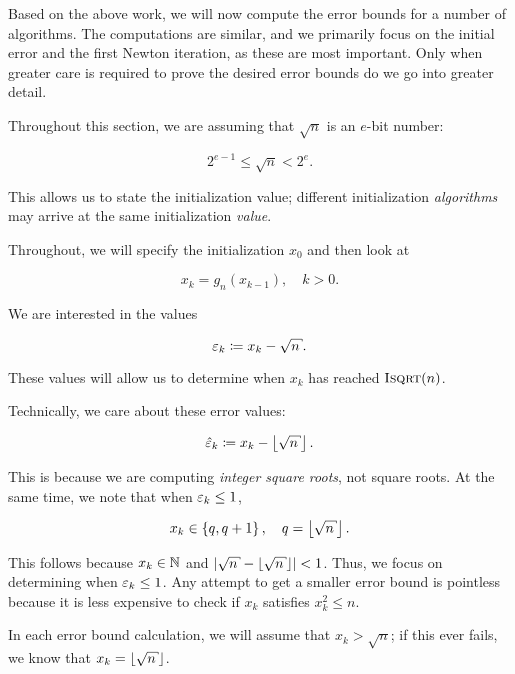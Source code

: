 Based on the above work, we will now compute the error bounds
for a number of algorithms.
The computations are similar,
and we primarily focus on the initial error and the first Newton iteration,
as these are most important.
Only when greater care is required to prove the desired
error bounds do we go into greater detail.

Throughout this section, we are assuming that $\sqrt{n}$ is an $e$-bit number:

\begin{equation}
    2^{e-1}\le \sqrt{n} < 2^{e}.
\end{equation}

\noindent
This allows us to state the initialization value;
different initialization \emph{algorithms} may arrive at the same
initialization \emph{value}.

Throughout, we will specify the initialization $x_{0}$
and then look at

\begin{equation}
    x_{k} = g_{n}(x_{k-1}), \quad k>0.
\end{equation}

\noindent
We are interested in the values

\begin{equation}
    \eps_{k} \mathDef{} x_{k} - \sqrt{n}.
\end{equation}

\noindent
These values will allow us to determine when $x_{k}$ has reached
$\textsc{Isqrt}(n)$.

Technically, we care about these error values:

\begin{equation}
    \hat{\eps}_{k} \mathDef{} x_{k} - \floor{\sqrt{n}}.
\end{equation}

\noindent
This is because we are computing \emph{integer square roots},
not square roots.
At the same time, we note that when $\varepsilon_{k}\le1$,

\begin{equation}
    x_{k}\in\braces{q, q+1}, \quad q=\floor{\sqrt{n}}.
\end{equation}

\noindent
This follows because $x_{k}\in\mathbb{N}$ and $\abs{\sqrt{n} - \floor{\sqrt{n}}} < 1$.
Thus, we focus on determining when $\varepsilon_{k}\le1$.
Any attempt to get a smaller error bound
is pointless because it is less expensive to check
if $x_{k}$ satisfies $x_{k}^{2} \le n$.

In each error bound calculation, we will assume that $x_{k} > \sqrt{n}$;
if this ever fails, we know that $x_{k} = \floor{\sqrt{n}}$.


